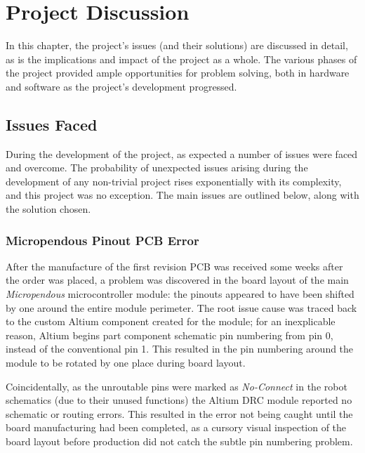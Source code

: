 \chapter{Project Discussion}
\label{chp:discussion}

In this chapter, the project's issues (and their solutions) are discussed in detail, as is the implications and impact of the project as a whole. The various phases of the project provided ample opportunities for problem solving, both in hardware and software as the project's development progressed.

\section{Issues Faced}

During the development of the project, as expected a number of issues were faced and overcome. The probability of unexpected issues arising during the development of any non-trivial project rises exponentially with its complexity, and this project was no exception. The main issues are outlined below, along with the solution chosen.

\FloatBarrier
\subsection{Micropendous Pinout PCB Error}

After the manufacture of the first revision PCB was received some weeks after the order was placed, a problem was discovered in the board layout of the main \textit{Micropendous} microcontroller module: the pinouts appeared to have been shifted by one around the entire module perimeter. The root issue cause was traced back to the custom Altium component created for the module; for an inexplicable reason, Altium begins part component schematic pin numbering from pin 0, instead of the conventional pin 1. This resulted in the pin numbering around the module to be rotated by one place during board layout.

Coincidentally, as the unroutable pins were marked as \textit{No-Connect} in the robot schematics (due to their unused functions) the Altium DRC module reported no schematic or routing errors. This resulted in the error not being caught until the board manufacturing had been completed, as a cursory visual inspection of the board layout before production did not catch the subtle pin numbering problem.

